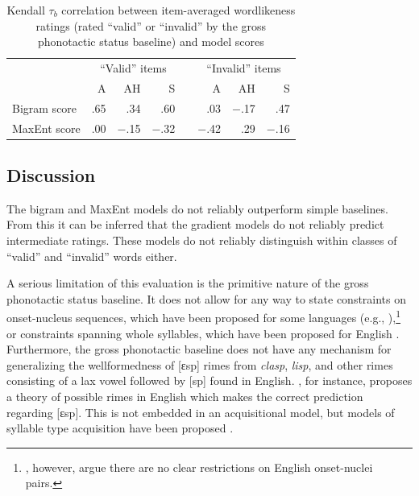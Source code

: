 \begin{table}[ht]
\centering
\begin{tabular}{l rrr c rrr}
\toprule                
             & \multicolumn{3}{c}{``Valid'' items} && \multicolumn{3}{c}{``Invalid'' items} \\
\cmidrule{2-4} \cmidrule{6-8}
             &         A &       AH &        S &&     A  &       AH &          S \\
\midrule
Bigram score &     {.65} &    {.34} &    {.60} &&    {.03} & {$-$.17} &    {.47} \\
MaxEnt score &     {.00} & {$-$.15} & {$-$.32} && {$-$.42} &    {.29} & {$-$.16} \\
\bottomrule
\end{tabular}
\caption{Kendall $\tau_{b}$ correlation between item-averaged wordlikeness ratings (rated ``valid'' or ``invalid'' by the gross phonotactic status baseline) and model scores}
\label{resid}
\end{table}

\subsection{Discussion}

The bigram and MaxEnt models do not reliably outperform simple baselines. From this it can be inferred that the gradient models do not reliably predict intermediate ratings. These models do not reliably distinguish within classes of ``valid'' and ``invalid'' words either.

A serious limitation of this evaluation is the primitive nature of the gross phonotactic status baseline. It does not allow for any way to state constraints on onset-nucleus sequences, which have been proposed for some languages (e.g., \citealt{Kirby2007}),\footnote{\citet{Kessler1997}, however, argue there are no clear restrictions on English onset-nuclei pairs.} or constraints spanning whole syllables, which have been proposed for English \citep[e.g.,][]{Berkley1994b,Berkley1994a,Coetzee2008b,Fudge1969}. Furthermore, the gross phonotactic baseline does not have any mechanism for generalizing the wellformedness of [ɛsp] rimes from \emph{clasp}, \emph{lisp}, and other rimes consisting of a lax vowel followed by [sp] found in English. \citet{Borowsky1989}, for instance, proposes a theory of possible rimes in English which makes the correct prediction regarding [ɛsp]. This is not embedded in an acquisitional model, but models of syllable type acquisition have been proposed \citep[e.g.,][]{Fikkert1994,Levelt2000,Pan2003,Pan2004}. 

